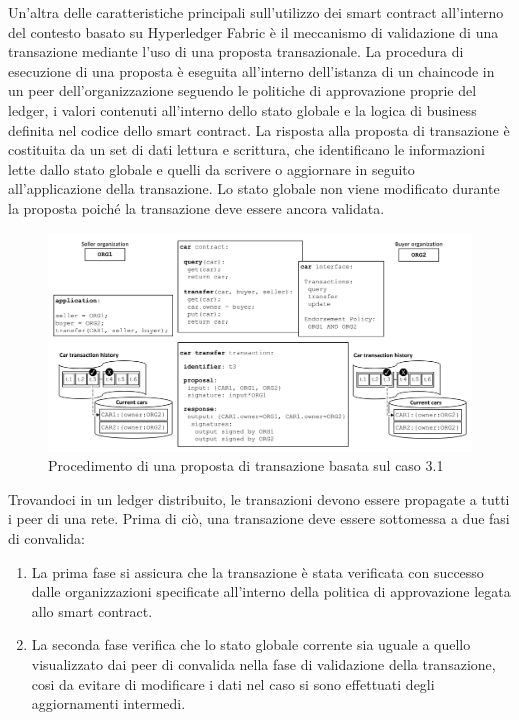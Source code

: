 Un'altra delle caratteristiche principali sull'utilizzo dei smart contract all'interno del contesto basato su Hyperledger Fabric è il meccanismo di validazione di una transazione mediante l'uso di una proposta transazionale. La procedura di esecuzione di una proposta è eseguita all'interno dell'istanza di un chaincode in un peer dell'organizzazione seguendo le politiche di approvazione proprie del ledger, i valori contenuti all'interno dello stato globale e la logica di business definita nel codice dello smart contract. La risposta alla proposta di transazione è costituita da un set di dati lettura e scrittura, che identificano le informazioni lette dallo stato globale e quelli da scrivere o aggiornare in seguito all'applicazione della transazione. Lo stato globale non viene modificato durante la proposta poiché la transazione deve essere ancora validata. 
\begin{figure}[h]
    \centering
    \includegraphics[width=1\textwidth]{img/transaction-proposal.png}
    \caption{Procedimento di una proposta di transazione basata sul caso 3.1}
    \label{fig:transaction-proposal}
\end{figure}
Trovandoci in un ledger distribuito, le transazioni devono essere propagate a tutti i peer di una rete. Prima di ciò, una transazione deve essere sottomessa a due fasi di convalida:
\newpage
\begin{enumerate}
    \item La prima fase si assicura che la transazione è stata verificata con successo dalle organizzazioni specificate all'interno della politica di approvazione legata allo smart contract. 
    \item La seconda fase verifica che lo stato globale corrente sia uguale a quello visualizzato dai peer di convalida nella fase di validazione della transazione, cosi da evitare di modificare i dati nel caso si sono effettuati degli aggiornamenti intermedi.
\end{enumerate}
